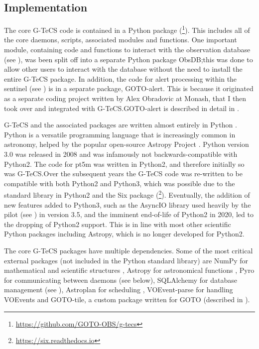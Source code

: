 
\subsection{Implementation}
\label{sec:implementation}
\begin{colsection}

The core G-TeCS code is contained in a Python package (\footnote{\url{https://github.com/GOTO-OBS/g-tecs}}). This includes all of the core daemons, scripts, associated modules and functions. One important module, containing code and functions to interact with the observation database (see ), was been split off into a separate Python package ObsDB;\@ this was done to allow other users to interact with the database without the need to install the entire G-TeCS package. In addition, the code for alert processing within the sentinel (see ) is in a separate package, GOTO-alert. This is because it originated as a separate coding project written by Alex Obradovic at Monash, that I then took over and integrated with G-TeCS.\@ GOTO-alert is described in detail in .

G-TeCS and the associated packages are written almost entirely in Python \citep{Python}. Python is a versatile programming language that is increasingly common in astronomy, helped by the popular open-source Astropy Project \citep{astropy}. Python version 3.0 was released in 2008 and was infamously not backwards-compatible with Python2. The code for pt5m was written in Python2, and therefore initially so was G-TeCS.\@ Over the subsequent years the G-TeCS code was re-written to be compatible with both Python2 and Python3, which was possible due to the standard  library in Python2 and the Six package (\footnote{\url{https://six.readthedocs.io}}). Eventually, the addition of new features added to Python3, such as the AsyncIO library used heavily by the pilot (see ) in version 3.5, and the imminent end-of-life of Python2 in 2020, led to the dropping of Python2 support. This is in line with most other scientific Python packages including Astropy, which is no longer developed for Python2. %

The core G-TeCS packages have multiple dependencies. Some of the most critical external packages (not included in the Python standard library) are NumPy for mathematical and scientific structures \citep{NumPy}, Astropy for astronomical functions \citep{astropy}, Pyro for communicating between daemons (see  below), SQLAlchemy for database management (see ), Astroplan for scheduling \citep[][see ]{astroplan}, VOEvent-parse for handling VOEvents \citep[][see ]{voevent-parse} and GOTO-tile, a custom package written for GOTO (described in ).

\end{colsection}

